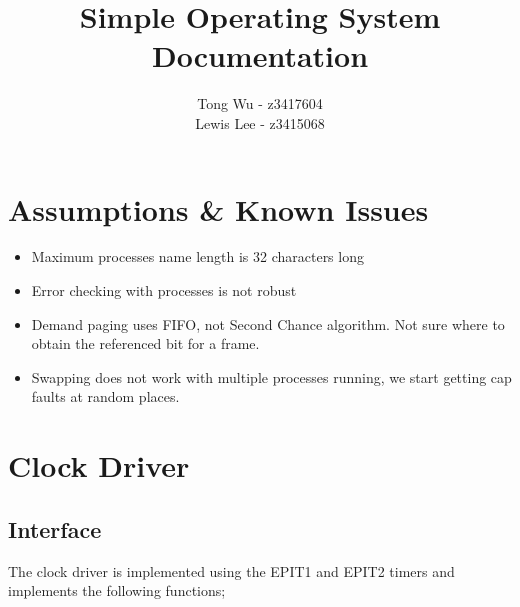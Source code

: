 \documentclass[12pt]{article}
\begin{document}
\pagestyle{myheadings}

\title{Simple Operating System\\Documentation}
\author{Tong Wu - z3417604\\Lewis Lee - z3415068}

\maketitle

\clearpage

\tableofcontents

\clearpage

\section{Assumptions \& Known Issues}
\begin{itemize}
\item Maximum processes name length is 32 characters long
\item Error checking with processes is not robust
\item Demand paging uses FIFO, not Second Chance algorithm. Not sure where to obtain the referenced bit for a frame.
\item Swapping does not work with multiple processes running, we start getting cap faults at random places.
\end{itemize}

\section{Clock Driver}
\subsection{Interface}
The clock driver is implemented using the EPIT1 and EPIT2 timers and implements the following functions;
\end{document}
